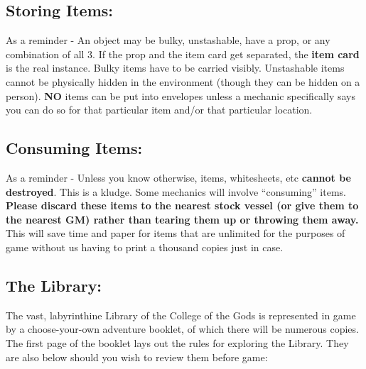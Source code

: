 \documentclass[sheet]{GL2020}
\begin{document}
{\subsection{Storing Items:}
As a reminder - An object may be bulky, unstashable, have a prop, or any combination of all 3. If the prop and the item card get separated, the \textbf{item card} is the real instance. Bulky items have to be carried visibly. Unstashable items cannot be physically hidden in the environment (though they can be hidden on a person). \textbf{NO} items can be put into envelopes unless a mechanic specifically says you can do so for that particular item and/or that particular location.

\subsection{Consuming Items:}
As a reminder - Unless you know otherwise, items, whitesheets, etc \textbf{cannot be destroyed}. This is a kludge. Some mechanics will involve ``consuming'' items. \textbf{Please discard these items to the nearest stock vessel (or give them to the nearest GM) rather than tearing them up or throwing them away.} This will save time and paper for items that are unlimited for the purposes of game without us having to print a thousand copies just in case.}

\subsection{The Library:}
The vast, labyrinthine Library of the College of the Gods is represented in game by a choose-your-own adventure booklet, of which there will be numerous copies. The first page of the booklet lays out the rules for exploring the Library. They are also below should you wish to review them before game:
\end{document}
